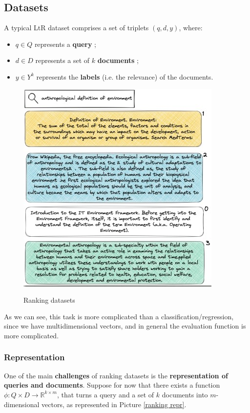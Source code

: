 \subsection{Datasets}

A typical LtR dataset comprises a set of triplets $(q,d,y)$, where:

\begin{itemize}
    \item $q \in Q$ represents a \textbf{query} ;
    \item $d \in D$ represents a set of $k$ \textbf{documents} ;
    \item $y \in Y^k$ represents the \textbf{labels} (i.e. the relevance) of the documents.
\end{itemize}

\begin{figure}[h!]
		\centering
		\includegraphics[scale = 1.5]{img/ranking datasets.jpg}
        \label{ranking datasets}
        \caption{Ranking datasets}
\end{figure}

As we can see, this task is more complicated than a classification/regression, since we have multidimensional vectors, and in general the evaluation function is more complicated.

\subsubsection{Representation}
One of the main \textbf{challenges} of ranking datasets is the \textbf{representation of queries and documents}. Suppose for now that there exists a function $\phi : Q \times D \to \mathbb{R}^{k \times m}$, that turns a query and a set of $k$ documents into $m$-dimensional vectors, as represented in Picture \ref{ranking repr}. 


